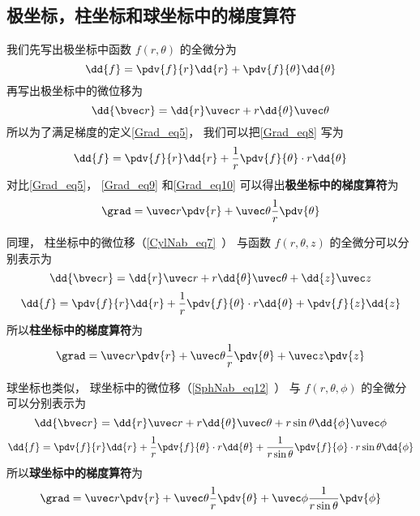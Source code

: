 \subsection{极坐标，柱坐标和球坐标中的梯度算符}\label{Grad_sub1}

我们先写出极坐标中函数 $f(r,\theta)$ 的全微分为
\begin{equation}\label{Grad_eq8}
\dd{f} = \pdv{f}{r} \dd{r} + \pdv{f}{\theta} \dd{\theta}
\end{equation}
再写出极坐标中的微位移为
\begin{equation}\label{Grad_eq9}
\dd{\bvec r} = \dd{r} \uvec r + r \dd{\theta} \uvec \theta
\end{equation}
所以为了满足梯度的定义\autoref{Grad_eq5}， 我们可以把\autoref{Grad_eq8} 写为
\begin{equation}\label{Grad_eq10}
\dd{f} = \pdv{f}{r} \dd{r} + \frac1r \pdv{f}{\theta} \cdot r\dd{\theta}
\end{equation}
对比\autoref{Grad_eq5}， \autoref{Grad_eq9} 和\autoref{Grad_eq10} 可以得出\textbf{极坐标中的梯度算符}为
\begin{equation}
\grad = \uvec r \pdv{r} + \uvec \theta \frac1r \pdv{\theta}
\end{equation}

同理， 柱坐标中的微位移（\autoref{CylNab_eq7}~） 与函数 $f(r,\theta, z)$ 的全微分可以分别表示为
\begin{equation}
\dd{\bvec r} = \dd{r} \uvec r + r\dd{\theta} \uvec \theta + \dd{z} \uvec z
\end{equation}
\begin{equation}
\dd{f} = \pdv{f}{r} \dd{r} + \frac1r \pdv{f}{\theta} \cdot  r\dd{\theta} + \pdv{f}{z} \dd{z}
\end{equation}
所以\textbf{柱坐标中的梯度算符}为
\begin{equation}
\grad = \uvec r \pdv{r} + \uvec \theta \frac1r \pdv{\theta} + \uvec z \pdv{z}
\end{equation}

球坐标也类似， 球坐标中的微位移（\autoref{SphNab_eq12}~） 与 $f(r,\theta,\phi)$ 的全微分可以分别表示为
\begin{equation}
\dd{\bvec r} = \dd{r}\uvec r + r\dd{\theta} \uvec \theta + r\sin\theta\dd{\phi}\uvec \phi
\end{equation}
\begin{equation}
\dd{f} = \pdv{f}{r} \dd{r} + \frac1r \pdv{f}{\theta} \cdot r\dd{\theta} + \frac{1}{ r\sin\theta} \pdv{f}{\phi} \cdot r\sin\theta\dd{\phi}
\end{equation}
所以\textbf{球坐标中的梯度算符}为
\begin{equation}
\grad = \uvec r \pdv{r} + \uvec \theta \frac1r \pdv{\theta} + \uvec \phi \frac{1}{ r\sin\theta} \pdv{\phi}
\end{equation}

